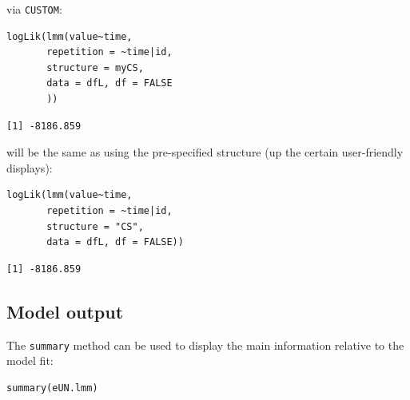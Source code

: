 \documentclass[12pt]{article}
\begin{document}
via \texttt{CUSTOM}:
\lstset{language=r,label= ,caption= ,captionpos=b,numbers=none}
\begin{lstlisting}
logLik(lmm(value~time,
	   repetition = ~time|id,
	   structure = myCS, 
	   data = dfL, df = FALSE
	   ))
\end{lstlisting}

\begin{verbatim}
[1] -8186.859
\end{verbatim}


will be the same as using the pre-specified structure (up the certain
user-friendly displays):
\lstset{language=r,label= ,caption= ,captionpos=b,numbers=none}
\begin{lstlisting}
logLik(lmm(value~time,
	   repetition = ~time|id,
	   structure = "CS", 
	   data = dfL, df = FALSE))
\end{lstlisting}

\begin{verbatim}
[1] -8186.859
\end{verbatim}


\clearpage

\subsection{Model output}
\label{sec:org690a084}

The \texttt{summary} method can be used to display the main information
relative to the model fit:
\lstset{language=r,label= ,caption= ,captionpos=b,numbers=none}
\begin{lstlisting}
summary(eUN.lmm)
\end{lstlisting}
\end{document}
